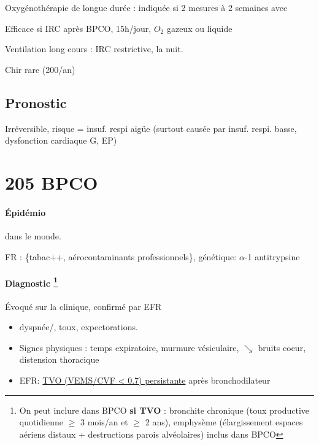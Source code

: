 \documentclass{book}
\begin{document}
Oxygénothérapie de longue durée : indiquée si 2 mesures à 2 semaines avec


Efficace si  IRC après BPCO, 15h/jour, \(O_2\) gazeux ou liquide

Ventilation long cours : IRC restrictive, la nuit.

Chir rare (200/an)

\subsection{Pronostic}
\label{sec:org5e81b52}
\label{sec:org2ec66b4}
Irréversible, risque = insuf. respi aigüe (surtout causée par insuf. respi. basse, dysfonction
cardiaque G, EP)


\section{205 BPCO}
\label{sec:orgfd0f346}

\paragraph{Épidémio}
\label{sec:org4282dc1}
\inc dans le monde. 

FR : \{tabac++, aérocontaminants professionnels\}, génétique: \(\alpha\)-1 antitrypsine

\paragraph{Diagnostic \footnote{On peut inclure dans BPCO \textbf{si TVO} : bronchite chronique (toux
productive quotidienne \(\ge\) 3 mois/an et \(\ge\) 2 ans), emphysème (élargissement espaces aériens distaux + destructions parois
alvéolaires) inclus dans BPCO}}
\label{sec:org61701d1}
Évoqué sur la clinique, confirmé par EFR
\begin{itemize}
\item dyspnée/, toux, expectorations.
\item Signes physiques  : \nearrow temps expiratoire, \searrow murmure vésiculaire, \(\searrow\) bruits coeur, distension thoracique
\item EFR: \uline{TVO (VEMS/CVF < 0.7) persistante} après bronchodilateur
\end{itemize}
\end{document}

